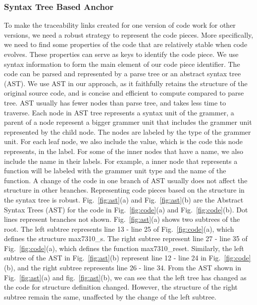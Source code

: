 \subsubsection{Syntax Tree Based Anchor}
To make the traceability links created for one version of code work for other versions,
we need a robust strategy to represent the code pieces.
More specifically, we need to find some properties of the code that are relatively stable when code evolves.
These properties can serve as keys to identify the code piece.
We use syntax information to form the main element of our code piece identifier.
The code can be parsed and represented by a parse tree or an abstract syntax tree (AST).
We use AST in our approach, as it faithfully retains the structure of the original source code, and is concise and efficient to compute compared to parse tree.
AST usually has fewer nodes than parse tree, and takes less time to traverse.
Each node in AST tree represents a syntax unit of the grammer,
a parent of a node represent a bigger grammer unit that includes the grammer unit represented by the child node.
The nodes are labeled by the type of the grammer unit.
For each leaf node, we also include the value, which is the code this node represents, in the label.
For some of the inner nodes that have a name, we also include the name in their labels. For example, a inner node that represents a function will be labeled with the grammer unit type and the name of the function.
A change of the code in one branch of AST usually does not affect the structure in other branches.
Representing code pieces based on the structure in the syntax tree is robust.
Fig.~\ref{fig:ast}(a) and Fig.~\ref{fig:ast}(b) are the Abstract Syntax Trees (AST) for the code in Fig.~\ref{fig:code}(a) and Fig.~\ref{fig:code}(b).
Dot lines represent branches not shown.
Fig.~\ref{fig:ast}(a) shows two subtrees of the root.
The left subtree represents line 13 - line 25 of Fig.~\ref{fig:code}(a), which defines the structure max7310\_s.
The right subtree represent line 27 - line 35 of Fig.~\ref{fig:code}(a), which defines the function max7310\_reset.
Similarly, the left subtree of the AST in Fig.~\ref{fig:ast}(b) represent line 12 - line 24 in Fig.~\ref{fig:code}(b), and the right subtree represents line 26 - line 34.
From the AST shown in Fig.~\ref{fig:ast}(a) and fig.~\ref{fig:ast}(b), we can see that the left tree has changed as the code for structure definition changed.
However, the structure of the right subtree remain the same, unaffected by the change of the left subtree.

